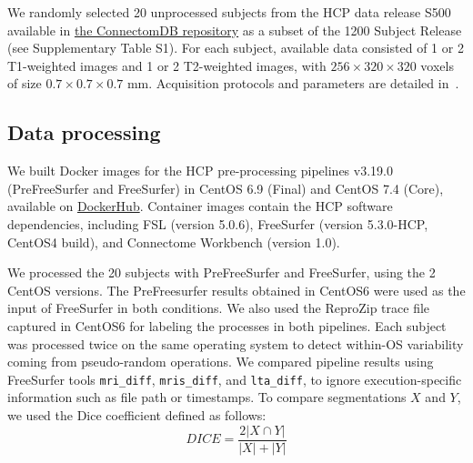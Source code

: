 \documentclass[a4paper,num-refs]{oup-contemporary}
\newcommand{\revised}[1]{\color{blue}#1\color{black}\xspace}
\newcommand{\reprozip}[0]{ReproZip\xspace}
\begin{document}
We randomly selected 20 unprocessed subjects from the HCP data release S500
available in \href{https://db.humanconnectome.org}{the ConnectomDB
repository} as a subset of the 1200 Subject Release \revised{(see Supplementary Table S1)}.
For each subject, available data consisted of 1 or 2 T1-weighted images and 1 or 2
T2-weighted images, with $256 \times 320 \times 320$ voxels of size $0.7
\times 0.7 \times 0.7$ mm. Acquisition protocols and parameters are
detailed in~\cite{van2013wu}.


\subsection{Data processing}

We built Docker images for the HCP pre-processing pipelines v3.19.0
(PreFreeSurfer and FreeSurfer) in CentOS 6.9 (Final) and CentOS 7.4 (Core), available on
\href{https://hub.docker.com/r/bigdatalabteam/hcp-prefreesurfer/}{DockerHub}.
Container images contain the HCP software dependencies, including FSL
(version 5.0.6), FreeSurfer (version 5.3.0-HCP, CentOS4 build), and
Connectome Workbench (version 1.0).

We processed the 20 subjects with PreFreeSurfer and FreeSurfer, using the 2 CentOS versions.
\revised{The PreFreesurfer results obtained in CentOS6 were used as the input of FreeSurfer in both conditions. 
We also used the \reprozip trace file captured in CentOS6 for labeling the processes in both pipelines.}
Each subject was processed twice on the same operating
system to detect within-OS variability coming from pseudo-random
operations. We compared pipeline results using  FreeSurfer tools \texttt{mri\_diff},
\texttt{mris\_diff}, and \texttt{lta\_diff}, to ignore execution-specific information such as file path or
timestamps. To compare segmentations $X$ and $Y$, we used the Dice coefficient defined as follows:
\[DICE=\frac{2|X \cap Y|}{|X| + |Y|}\]
\end{document}
